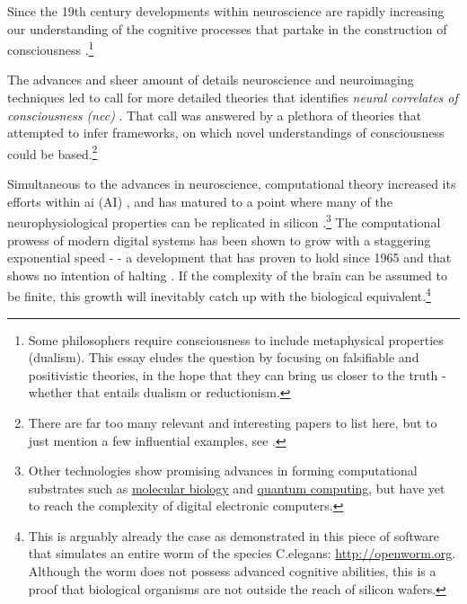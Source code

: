 \documentclass[a4paper,oneside]{memoir}
\begin{document}
Since the 19th century developments within neuroscience are rapidly
increasing our understanding of the cognitive processes that partake in
the construction of \gls{consciousness} \autocite{atkinson2000}.\footnote{
Some philosophers require consciousness
to include metaphysical properties \autocite{sep-consciousness} (dualism).
This essay eludes the question by
focusing on falsifiable and positivistic theories, in the hope that
they can bring us closer to the truth - whether that entails dualism
or reductionism.}

The advances and sheer amount of details neuroscience and neuroimaging
techniques led \textcite{atkinson2000} to call for more detailed theories
that identifies \textit{neural correlates of consciousness (\gls{ncc})}
\autocite{atkinson2000}. That call was answered by a plethora of theories
that attempted to infer frameworks, on which novel understandings of
consciousness could be based.\footnote{There are far too many relevant
and interesting papers to list here, but to just mention a few influential examples,
see \cite{baars2005, block2007, crick2003, damasio2003, dehaene2001, graziano2013, kouider2010, Tononi2004, zeki2008, schmidhuber2014, Nilsson2009}.
}

Simultaneous to the advances in neuroscience, \gls{computation}al theory
increased its efforts within \gls{ai} (AI) \autocite{Nilsson2009}, and has
matured to a point where many of the neurophysiological properties can be
replicated in silicon \autocite{Tononi2004, schmidhuber2014, walter2015}.\footnote{Other
technologies show promising advances in forming computational substrates such
as \href{https://en.wikipedia.org/wiki/DNA_computing}{molecular biology}
and \href{https://en.wikipedia.org/wiki/Quantum_computing}{quantum computing},
but have yet to reach the complexity of digital electronic computers.}
The computational prowess of modern digital systems has been shown to grow
with a staggering exponential speed \autocite{Moore1965} - - a development that has proven to
hold since 1965 and that shows no intention of halting
\autocite{Moravec98,kurzweil2001}. If the complexity of the brain can be 
assumed to be finite, this growth will inevitably catch up with the biological
equivalent.\footnote{This is arguably already the case as demonstrated in this
piece of software that simulates an entire worm of the species C.elegans:
\url{http://openworm.org}. Although the worm does not possess advanced cognitive
abilities, this is a proof that biological organisms are not outside the reach
of silicon wafers.}
\end{document}

